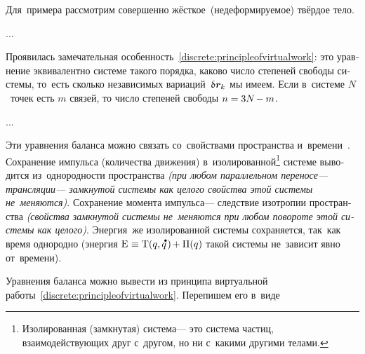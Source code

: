 \begin{otherlanguage}{russian}
Для~примера рассмотрим совершенно жёсткое~(недеформируемое) твёрдое тело.

...


Проявилась замечательная особенность~\eqref{discrete:principleofvirtualwork}: это уравнение эквивалентно системе такого порядка, каково число степеней свободы системы, то~есть сколько независимых вариаций~${\variation{\hspace{.1ex}\bm{r}_k}}$ мы имеем. Если в~системе $N$~точек есть $m$ связей, то число степеней свободы ${n = 3N \hspace{-0.25ex} - m}$.

...




Эти уравнения баланса можно связать со~свойствами пространства и~времени~\cite{landau.lifshitz-shortcourse}. Сохранение импульса (количества движения) в~изолированной\footnote{Изолированная (замкнутая) система\:--- это система частиц, взаимодействующих друг с~другом, но ни с~какими другими телами.}\hspace{-0.25ex} системе выводится из~однородности пространства \emph{(при любом параллельном переносе\:--- трансляции\:--- замкнутой системы как целого свойства этой системы не~меняются)}. Сохранение момента импульса\:--- следствие изотропии пространства \emph{(свойства замкнутой системы не~меняются при любом повороте этой системы как целого)}. Энергия~же изолированной системы сохраняется, так~как время однородно (энергия ${\mathrm{E} \hspace{.1ex} \equiv \mathrm{T}(q, \mathdotabove{q} \hspace{.2ex}) \hspace{-0.2ex} + \Pi(q)}$ такой системы не~зависит явно от~времени).

Уравнения баланса можно вывести из принципа виртуальной работы~\eqref{discrete:principleofvirtualwork}. Перепишем его в~виде


\end{otherlanguage}

